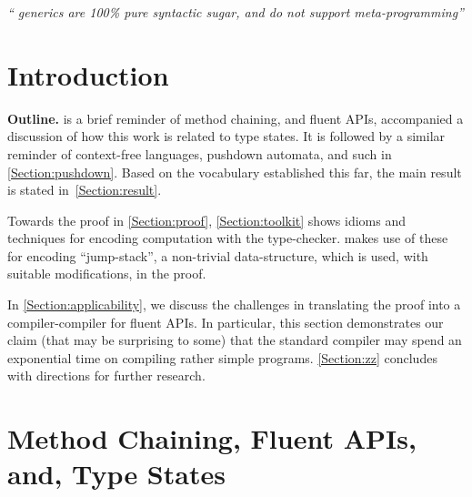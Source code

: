 \documentclass[a4paper,USenglish]{lipics}
\author{Joseph (Yossi) Gil \& Tomer Levy
}
\begin{document}
\maketitle
\hfill
\parbox{40ex}{%
  \begin{flushright}
    \scriptsize\itshape `` generics are 100\% pure syntactic sugar,
    and do not support meta-programming''\footnotemark
  \end{flushright}
}
\newline


\begin{abstract}
  
\end{abstract}

\section{Introduction}


\textbf{Outline.} \small
{} is a brief reminder of method chaining, 
  and fluent APIs, accompanied a discussion of how this work is related to type states.
It is followed by a similar reminder of context-free languages, pushdown automata, 
  and such in \cref{Section:pushdown}.
Based on the vocabulary established this far, 
  the main result is stated in~\cref{Section:result}.
  
Towards the proof in \cref{Section:proof}, \cref{Section:toolkit} 
  shows idioms and techniques for encoding computation with    
  the \Java type-checker.
 makes use of these for encoding 
  ``jump-stack'', a non-trivial data-structure,
  which is used, with suitable modifications, in the proof. 

In \cref{Section:applicability}, we discuss the challenges in
  translating the proof into a compiler-compiler for fluent APIs.
In particular, this section demonstrates our claim (that may be
  surprising to some) that the standard \Java compiler may spend
  an exponential time on compiling rather simple programs.
\cref{Section:zz} concludes with directions for further research.
\normalsize

\section{Method Chaining, Fluent APIs, and, Type States}
\label{Section:fluent}

\end{document}
